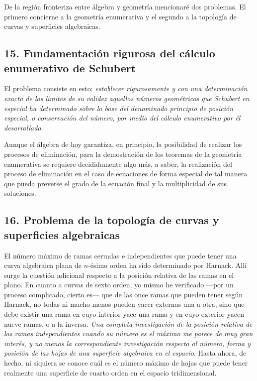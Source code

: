 \documentclass[a4paper, 12pt]{article}
\begin{document}
De la región fronteriza entre álgebra y geometría mencionaré dos problemas. El primero concierne a la geometría enumerativa y el segundo a la topología de curvas y superficies algebraicas.


\subsection*{15. Fundamentación rigurosa del cálculo enumerativo de Schubert}

El problema consiste en esto: \textit{establecer rigurosamente y con una determinación exacta de los límites de su validez aquellos números geométricos que Schubert en especial ha determinado sobre la base del denominado principio de posición especial, o conservación del número, por medio del cálculo enumerativo por él desarrollado}.

Aunque el álgebra de hoy garantiza, en principio, la posibilidad de realizar los procesos de eliminación, para la demostración de los teoremas de la geometría enumerativa se requiere decididamente algo más, a saber, la realización del proceso de eliminación en el caso de ecuaciones de forma especial de tal manera que pueda preverse el grado de la ecuación final y la multiplicidad de sus soluciones.	

\subsection*{16. Problema de la topología de curvas y superficies algebraicas}




El número máximo de ramas cerradas e independientes que puede tener una curva algebraica plana de $n$-ésimo orden ha sido determinado por Harnack. Allí surge la cuestión adicional respecto a la posición relativa de las ramas en el plano. En cuanto a curvas de sexto orden, yo mismo he verificado ---por un proceso complicado, cierto es--- que de las once ramas que pueden tener según Harnack, no todas ni mucho menos pueden yacer externas una a otra, sino que debe existir una rama en cuyo interior yace una rama y en cuyo exterior yacen nueve ramas, o a la inversa. \textit{Una completa investigación de la posición relativa de las ramas independientes cuando su número es el máximo me parece de muy gran interés, y no menos la correspondiente investigación respecto al número, forma y posición de las hojas de una superficie algebraica en el espacio}. Hasta ahora, de hecho, ni siquiera se conoce cuál es el número máximo de hojas que puede tener realmente una superficie de cuarto orden en el espacio tridimensional.
\end{document}
